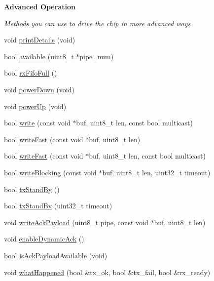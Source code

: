 \begin{Indent}{\bf Advanced Operation}\par
{\em Methods you can use to drive the chip in more advanced ways }\begin{DoxyCompactItemize}
\item 
void \hyperlink{class_r_f24_adc95213ed4c8569a90eb33122e16cea6}{print\+Details} (void)
\item 
bool \hyperlink{class_r_f24_ace7dd139fabc16b77cb8325faa07620f}{available} (uint8\+\_\+t $\ast$pipe\+\_\+num)
\item 
bool \hyperlink{class_r_f24_ad22e44fe1a68747872fcb304a407fd30}{rx\+Fifo\+Full} ()
\item 
void \hyperlink{class_r_f24_aa0a51923a09ba4f3478aba9be0f8a6a1}{power\+Down} (void)
\item 
void \hyperlink{class_r_f24_a5cdaf47aa0edd6dca1b9a8bb7972a1a3}{power\+Up} (void)
\item 
bool \hyperlink{class_r_f24_a23bfe6502d74bb5bbccb3a7f2ba2b5ea}{write} (const void $\ast$buf, uint8\+\_\+t len, const bool multicast)
\item 
bool \hyperlink{class_r_f24_a47b2516993481b58e724d1274a7fd9cb}{write\+Fast} (const void $\ast$buf, uint8\+\_\+t len)
\item 
bool \hyperlink{class_r_f24_ad16d53de0327c0b41d170cbda4bf41af}{write\+Fast} (const void $\ast$buf, uint8\+\_\+t len, const bool multicast)
\item 
bool \hyperlink{class_r_f24_ae6fd8d5ee490d54ae1cb2e8fefee535f}{write\+Blocking} (const void $\ast$buf, uint8\+\_\+t len, uint32\+\_\+t timeout)
\item 
bool \hyperlink{class_r_f24_a12cc453453c94969d4d3f0edb3778c83}{tx\+Stand\+By} ()
\item 
bool \hyperlink{class_r_f24_aa6f36353c1bdfbaf3c530d118cb84baa}{tx\+Stand\+By} (uint32\+\_\+t timeout)
\item 
void \hyperlink{class_r_f24_a65619238c25036c3de72dc2c1a1c6e52}{write\+Ack\+Payload} (uint8\+\_\+t pipe, const void $\ast$buf, uint8\+\_\+t len)
\item 
void \hyperlink{class_r_f24_a6253607ac2a1995af91a35cea6899c31}{enable\+Dynamic\+Ack} ()
\item 
bool \hyperlink{class_r_f24_a30c2736fd0df9c8128cef408c8b88e92}{is\+Ack\+Payload\+Available} (void)
\item 
void \hyperlink{class_r_f24_afb97dc4bdf4d2d84ea44060ac5b4ed89}{what\+Happened} (bool \&tx\+\_\+ok, bool \&tx\+\_\+fail, bool \&rx\+\_\+ready)
\item 

\end{DoxyCompactItemize}
\end{Indent}
